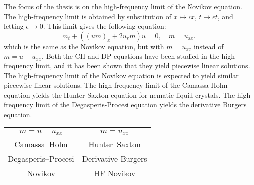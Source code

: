 \documentclass[english,master]{liumaiex}
\theoremstyle{plain}
\theoremstyle{definition}
\begin{document}
The focus of the thesis is on the high-frequency limit of the Novikov equation. The high-frequency limit is obtained by substitution of $x \mapsto \epsilon x$, $t \mapsto \epsilon t$, and letting $\epsilon \rightarrow 0$. This limit gives the following equation:
\begin{equation} \label{eq:Novikov_high_freq}
	m_t + ((um)_x + 2u_xm) u = 0,\quad m = u_{xx}.
\end{equation}
which is the same as the Novikov equation, but with $m = u_{xx}$ instead of $m = u - u_{xx}$. Both the CH and DP equations have been studied in the high-frequency limit, and it has been shown that they yield piecewise linear solutions\cite{Lundmark_2022}. The high-frequency limit of the Novikov equation is expected to yield similar piecewise linear solutions. The high frequency limit of the Camassa Holm equation yields the Hunter-Saxton equation\cite{HunterSaxton_1991,HunterZheng1994} for nematic liquid crystals. The high frequency limit of the Degasperis-Procesi equation yields the derivative Burgers equation\cite{KohlenbergLundmarkSzmigielski_2007, LundmarkSzmigielski_2008}.
\begin{center}
  \begin{tabular}{c|c}
    $m=u-u_{xx}$ & $m=u_{xx}$ \\
    \hline
    Camassa--Holm & Hunter--Saxton \\
    \hline
    Degasperis--Procesi & Derivative Burgers \\
    \hline
    Novikov & HF Novikov \\
  \end{tabular}
\end{center}
\end{document}
